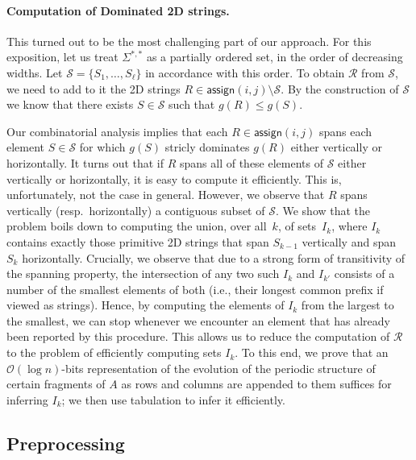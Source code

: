 \documentclass[11pt,letterpaper]{article}
\newcommand{\cO}{\mathcal{O}}
\newcommand{\assign}{\textsf{assign}}
\renewcommand{\S}{\mathcal{S}}
\begin{document}
\paragraph*{Computation of Dominated 2D strings.}
This turned out to be the most challenging part of our approach.
For this exposition, let us treat $\Sigma^{*,*}$ as a partially ordered set, in the order of decreasing widths.
Let $\S=\{S_1, \ldots , S_\ell\}$ in accordance with this order.
To obtain $\mathcal{R}$ from $\S$, we need to add to it the 2D strings $R \in \assign(i,j) \setminus \S$. By the construction of $\S$ we know
that there exists $S\in \S$ such that $g(R) \leq g(S)$.

Our combinatorial analysis implies that each $R \in \assign(i,j)$ spans each element $S \in \mathcal{S}$ for which $g(S)$ stricly dominates $g(R)$ either vertically or horizontally.
It turns out that if $R$ spans all of these elements of $\S$ either vertically or horizontally, it is easy to compute it efficiently.
This is, unfortunately, not the case in general.
However, we observe that $R$ spans vertically (resp.~horizontally) a contiguous subset of $\S$.
We show that the problem boils down to computing the union, over all~$k$, of sets~$I_k$, where $I_k$ contains exactly those primitive 2D strings that span $S_{k-1}$ vertically and span~$S_k$ horizontally.
Crucially, we observe that due to a strong form of transitivity of the spanning property, the intersection of any two such $I_k$ and $I_{k'}$ consists of a number of the smallest elements of both (i.e., their longest common prefix if viewed as strings).
Hence, by computing the elements of $I_k$ from the largest to the smallest, we can stop whenever we encounter an element that has already been reported by this procedure.
This allows us to reduce the computation of $\mathcal{R}$ to the problem of efficiently computing sets $I_k$.
To this end, we prove that an $\cO(\log n)$-bits representation of the evolution of the periodic structure of certain fragments of $A$ as rows and columns are appended to them suffices for inferring $I_k$; we then use tabulation to infer it efficiently.

\subsection{Preprocessing}
\end{document}
